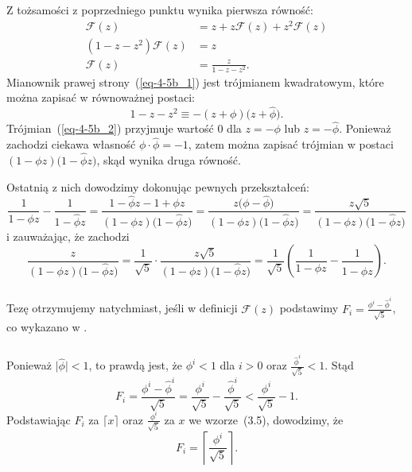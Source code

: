 \subsubsection{} %
Z tożsamości z poprzedniego punktu wynika pierwsza równość:
\begin{align}
	\mathcal{F}(z) &= z+z\mathcal{F}(z)+z^2\mathcal{F}(z) \nonumber \\
	(1-z-z^2)\mathcal{F}(z) &= z \nonumber \\
	\mathcal{F}(z) &= \frac{z}{1-z-z^2}. \label{eq-4-5b_1}
\end{align}
Mianownik prawej strony~(\ref{eq-4-5b_1}) jest trójmianem kwadratowym, które można zapisać w równoważnej postaci:
\begin{equation}
	1-z-z^2 \equiv -(z+\phi)\bigl(z+\widehat\phi\bigr).\label{eq-4-5b_2}
\end{equation}
Trójmian~(\ref{eq-4-5b_2}) przyjmuje wartość 0 dla $z=-\phi$ lub $z=-\widehat\phi$. Ponieważ zachodzi ciekawa własność $\phi\cdot\widehat\phi=-1$, zatem można zapisać trójmian w postaci $(1-\phi z)\bigl(1-\widehat\phi z\bigr)$, skąd wynika druga równość.

Ostatnią z nich dowodzimy dokonując pewnych przekształceń:
\[
	\frac{1}{1-\phi z}-\frac{1}{1-\widehat\phi z} = \frac{1-\widehat\phi z-1+\phi z}{(1-\phi z)\bigl(1-\widehat\phi z\bigr)} = \frac{z\bigl(\phi-\widehat\phi\bigr)}{(1-\phi z)\bigl(1-\widehat\phi z\bigr)} = \frac{z\sqrt{5}}{(1-\phi z)\bigl(1-\widehat\phi z\bigr)}
\]
i zauważając, że zachodzi
\[
	\frac{z}{(1-\phi z)\bigl(1-\widehat\phi z\bigr)} = \frac{1}{\sqrt{5}}\cdot\frac{z\sqrt{5}}{(1-\phi z)\bigl(1-\widehat\phi z\bigr)} = \frac{1}{\sqrt{5}}\left(\frac{1}{1-\phi z}-\frac{1}{1-\widehat\phi z}\right).
\]

\subsubsection{} %
Tezę otrzymujemy natychmiast, jeśli w definicji $\mathcal{F}(z)$ podstawimy $F_i=\frac{\phi^i-\widehat\phi^i}{\sqrt{5}}$, co wykazano w .

\subsubsection{} %
Ponieważ $\bigl|\widehat\phi\bigr|<1$, to prawdą jest, że $\phi^i<1$ dla $i>0$ oraz $\frac{\widehat\phi^i}{\sqrt{5}}<1$. Stąd
\[
	F_i = \frac{\phi^i-\widehat\phi^i}{\sqrt{5}} = \frac{\phi^i}{\sqrt{5}}-\frac{\widehat\phi^i}{\sqrt{5}} < \frac{\phi^i}{\sqrt{5}}-1.
\]
Podstawiając $F_i$ za $\lceil x\rceil$ oraz $\frac{\phi^i}{\sqrt{5}}$ za $x$ we wzorze~(3.5), dowodzimy, że
\[
	F_i = \left\lceil\frac{\phi^i}{\sqrt{5}}\right\rceil.
\]

